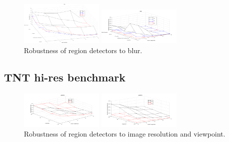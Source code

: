 \documentclass{article}
\begin{document}
\begin{figure}[htb]

\begin{minipage}[b]{.49\linewidth}
  \centering
  \centerline{\includegraphics[width=4.0cm]{./Figs/blur_some_combined}}
\end{minipage}
\hfill
\begin{minipage}[b]{0.49\linewidth}
  \centering
  \centerline{\includegraphics[width=4.0cm]{./Figs/blur_some_combined_numreg}}
\end{minipage}
\vspace{-0.25cm}
\caption{Robustness of region detectors to blur.}
\label{fig:blur}
%
\end{figure}

\subsection{TNT hi-res benchmark}
\label{ssec:tnt}

\begin{figure}[htb]

\begin{minipage}[b]{.49\linewidth}
  \centering
  \centerline{\includegraphics[width=4.0cm]{./Figs/posters_rep}}
\end{minipage}
\hfill
\begin{minipage}[b]{0.49\linewidth}
  \centering
  \centerline{\includegraphics[width=4.0cm]{./Figs/posters_numreg}}
\end{minipage}
\vspace{-0.25cm}
\caption{Robustness of region detectors to image resolution and viewpoint.}
\label{fig:tnt}
%
\end{figure}
\end{document}
